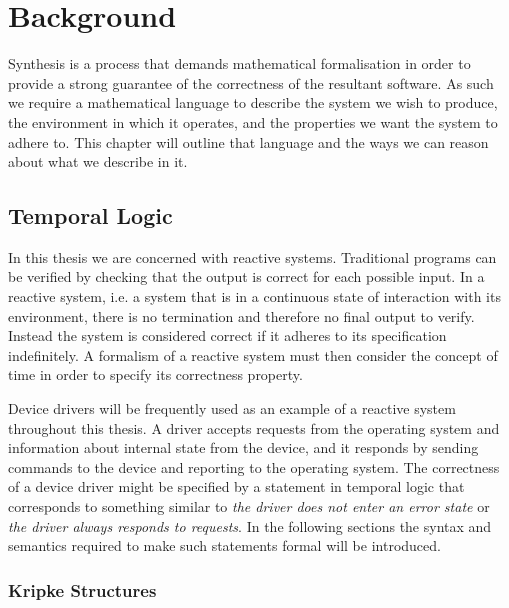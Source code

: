 \chapter{Background}
\label{ch:background}

\newcommand{\ctlE}[0]{\textbf{E}}
\newcommand{\ctlA}[0]{\textbf{A}}
\newcommand{\ltlF}[0]{\textbf{F}}
\newcommand{\ltlG}[0]{\textbf{G}}
\newcommand{\ltlX}[0]{\textbf{X}}


Synthesis is a process that demands mathematical formalisation in order to provide a strong guarantee of the correctness of the resultant software. As such we require a mathematical language to describe the system we wish to produce, the environment in which it operates, and the properties we want the system to adhere to. This chapter will outline that language and the ways we can reason about what we describe in it.

\section{Temporal Logic}

In this thesis we are concerned with reactive systems. Traditional programs can be verified by checking that the output is correct for each possible input. In a reactive system, i.e. a system that is in a continuous state of interaction with its environment, there is no termination and therefore no final output to verify. Instead the system is considered correct if it adheres to its specification indefinitely. A formalism of a reactive system must then consider the concept of time in order to specify its correctness property. 

Device drivers will be frequently used as an example of a reactive system throughout this thesis. A driver accepts requests from the operating system and information about internal state from the device, and it responds by sending commands to the device and reporting to the operating system. The correctness of a device driver might be specified by a statement in temporal logic that corresponds to something similar to \emph{the driver does not enter an error state} or \emph{the driver always responds to requests}. In the following sections the syntax and semantics required to make such statements formal will be introduced.

\subsection{Kripke Structures}

